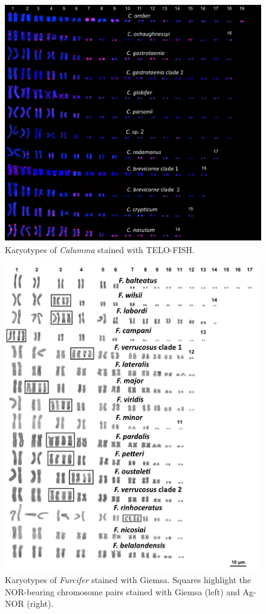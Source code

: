 \documentclass[a4paper, 12pt]{article}
\begin{document}
\newpage
\begin{figure}[h]
 \centering
  \includegraphics[width = \linewidth]{figures/marcello-s4.jpg}
  \caption{Karyotypes of \textit{Calumma} stained with TELO-FISH.
}
  \label{fig-s4}
\end{figure}

\newpage
\begin{figure}[h]
 \centering
  \includegraphics[width = \linewidth]{figures/marcello-s5.jpg}
  \caption{Karyotypes of \textit{Furcifer} stained with Giemsa. Squares highlight the NOR-bearing chromosome pairs stained with Giemsa (left) and Ag-NOR (right).
}
  \label{fig-s5}
\end{figure}
\end{document}
